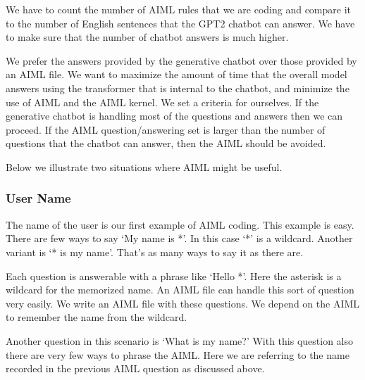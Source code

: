 We have to count the number of AIML rules that we are coding and compare it to the number of English sentences that the GPT2 chatbot can answer. We have to make sure that the number of chatbot answers is much higher. 


We prefer the answers provided by the generative chatbot over those provided by an AIML file. We want to maximize the amount of time that the overall model answers using the transformer that is internal to the chatbot, and minimize the use of AIML and the AIML kernel. We set a criteria for ourselves. If the generative chatbot is handling most of the questions and answers then we can proceed. If the AIML question/answering set is larger than the number of questions that the chatbot can answer, then the AIML should be avoided. 

Below we illustrate two situations where AIML might be useful.

\subsubsection{User Name}
The name of the user is our first example of AIML coding. This example is easy. There are few ways to say `My name is *'. In this case `*' is a wildcard. Another variant is `* is my name'. That's as many ways to say it as there are.

Each question is answerable with a phrase like `Hello *'. Here the asterisk is a wildcard for the memorized name. An AIML file can handle this sort of question very easily. We write an AIML file with these questions. We depend on the AIML to remember the name from the wildcard. 

Another question in this scenario is `What is my name?' With this question also there are very few ways to phrase the AIML. Here we are referring to the name recorded in the previous AIML question as discussed above. 


